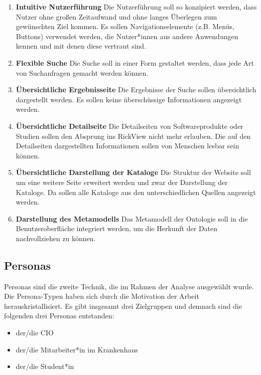 \begin{enumerate}
\item \textbf{Intuitive Nutzerführung} \newline
Die Nutzerführung soll so konzipiert werden, dass Nutzer ohne großen Zeitaufwand und ohne langes Überlegen zum gewünschten Ziel kommen. 
Es sollen Navigationselemente (z.B. Menüs, Buttons) verwendet werden, die Nutzer*innen aus andere Anwendungen kennen und mit denen diese vertraut sind.
\item \textbf{Flexible Suche} \newline
Die Suche soll in einer Form gestaltet werden, dass jede Art von Suchanfragen gemacht werden können.
\item \textbf{\"Ubersichtliche Ergebnisseite} \newline
Die Ergebnisse der Suche sollen übersichtlich dargestellt werden.
Es sollen keine überschüssige Informationen angezeigt werden.
\item \textbf{\"Ubersichtliche Detailseite} \newline
Die Detailseiten von Softwareprodukte oder Studien sollen den Absprung ins RickView nicht mehr erlauben.
Die auf den Detailseiten dargestellten Informationen sollen von Menschen lesbar sein können.
\item \textbf{\"Ubersichtliche Darstellung der Kataloge} \newline
Die Struktur der Website soll um eine weitere Seite erweitert werden und zwar der Darstellung der Kataloge.
Da sollen alle Kataloge aus den unterschiedlichen Quellen angezeigt werden.
\item \textbf{Darstellung des Metamodells} \newline
Das Metamodell der Ontologie soll in die Benutzeroberfläche integriert werden, um die Herkunft der Daten nachvollziehen zu können.
\end{enumerate}

\subsection{Personas}

Personas sind die zweite Technik, die im Rahmen der Analyse ausgewählt wurde.
Die Persona-Typen haben sich durch die Motivation der Arbeit herauskristallisiert.
Es gibt insgesamt drei Zielgruppen und demnach sind die folgenden drei Personas entstanden:

\begin{itemize}
\item der/die \ac{CIO}
\item der/die Mitarbeiter*in im Krankenhaus
\item der/die Student*in
\end{itemize}

